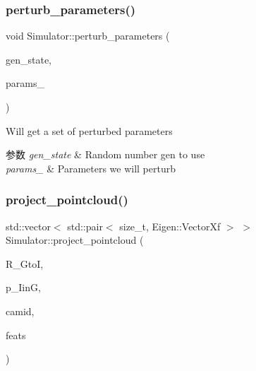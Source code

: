 \subsubsection{\texorpdfstring{perturb\+\_\+parameters()}{perturb\_parameters()}}
{\footnotesize\ttfamily void Simulator\+::perturb\+\_\+parameters (\begin{DoxyParamCaption}\item[{std\+::mt19937}]{gen\+\_\+state,  }\item[{\hyperlink{structov__msckf_1_1VioManagerOptions}{Vio\+Manager\+Options} \&}]{params\+\_\+ }\end{DoxyParamCaption})\hspace{0.3cm}{\ttfamily [static]}}



Will get a set of perturbed parameters 


\begin{DoxyParams}{参数}
{\em gen\+\_\+state} & Random number gen to use \\
\hline
{\em params\+\_\+} & Parameters we will perturb \\
\hline
\end{DoxyParams}
\mbox{\label{classov__msckf_1_1Simulator_a1c6947099892bd64e2bad9b4c9303226}} 
\subsubsection{\texorpdfstring{project\+\_\+pointcloud()}{project\_pointcloud()}}
{\footnotesize\ttfamily std\+::vector$<$ std\+::pair$<$ size\+\_\+t, Eigen\+::\+Vector\+Xf $>$ $>$ Simulator\+::project\+\_\+pointcloud (\begin{DoxyParamCaption}\item[{const Eigen\+::\+Matrix3d \&}]{R\+\_\+\+GtoI,  }\item[{const Eigen\+::\+Vector3d \&}]{p\+\_\+\+IinG,  }\item[{int}]{camid,  }\item[{const std\+::unordered\+\_\+map$<$ size\+\_\+t, Eigen\+::\+Vector3d $>$ \&}]{feats }\end{DoxyParamCaption})\hspace{0.3cm}{\ttfamily [protected]}}



